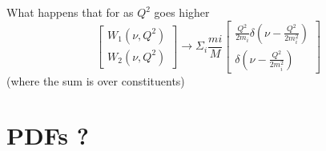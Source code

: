 \documentclass[11pt]{article}
\begin{document}
	What happens that for as $Q^2$ goes higher
	\[
	\begin{bmatrix}
		W_1(\nu, Q^2)\\ W_2(\nu, Q^2)   
	\end{bmatrix} \rightarrow
	\Sigma_{i}\frac{mi}{M}\begin{bmatrix}
	\frac{Q^2}{2m_i}\delta(\nu-\frac{Q^2}{2m_i^2})\\ \delta(\nu - \frac{Q^2}{2m_i^2})   
	\end{bmatrix}
	\]
	(where the sum is over constituents)
	
	
	
	\section{PDFs ?}
	
	
	
	
\end{document}
